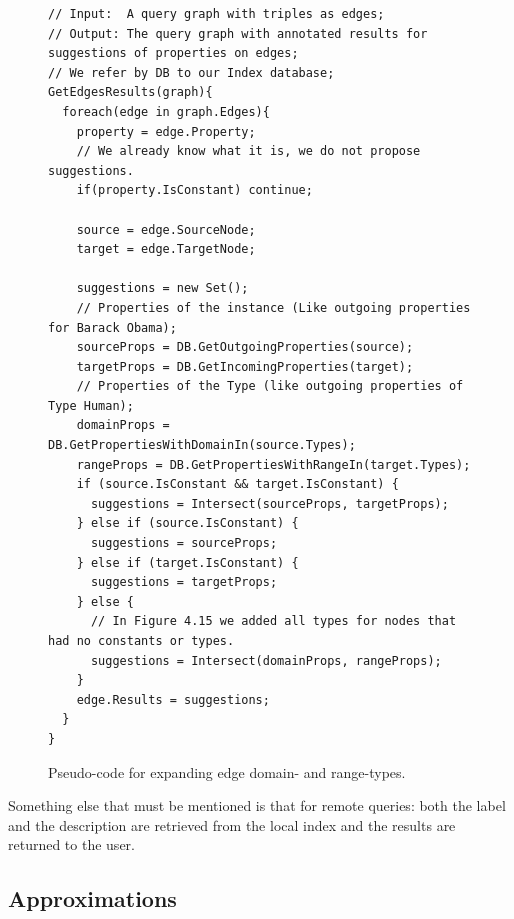 \begin{example}
\begin{figure}[h]
\begin{verbatim}
// Input:  A query graph with triples as edges;
// Output: The query graph with annotated results for suggestions of properties on edges;
// We refer by DB to our Index database;
GetEdgesResults(graph){
  foreach(edge in graph.Edges){
    property = edge.Property;
    // We already know what it is, we do not propose suggestions.
    if(property.IsConstant) continue;
    
    source = edge.SourceNode;
    target = edge.TargetNode;

    suggestions = new Set();
    // Properties of the instance (Like outgoing properties for Barack Obama);
    sourceProps = DB.GetOutgoingProperties(source);
    targetProps = DB.GetIncomingProperties(target);
    // Properties of the Type (like outgoing properties of Type Human);
    domainProps = DB.GetPropertiesWithDomainIn(source.Types);
    rangeProps = DB.GetPropertiesWithRangeIn(target.Types);
    if (source.IsConstant && target.IsConstant) {
      suggestions = Intersect(sourceProps, targetProps);
    } else if (source.IsConstant) {
      suggestions = sourceProps;
    } else if (target.IsConstant) {
      suggestions = targetProps;
    } else {
      // In Figure 4.15 we added all types for nodes that had no constants or types.
      suggestions = Intersect(domainProps, rangeProps);
    }
    edge.Results = suggestions;
  }
}
\end{verbatim}
\caption{Pseudo-code for expanding edge domain- and range-types.}
\label{fig:codeResultsEdges}
\end{figure}

\end{example}

Something else that must be mentioned is that for remote queries: both the label and the description are retrieved from the local index and the results are returned to the user. 


\subsection{Approximations}

